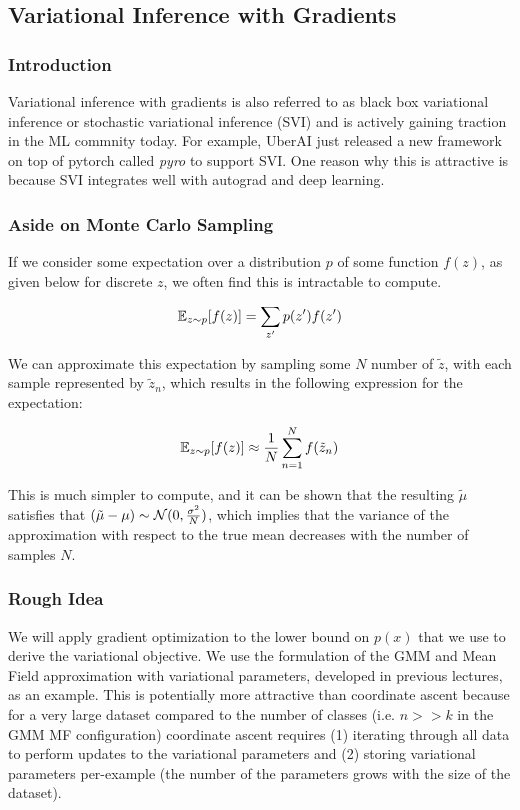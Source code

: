 \documentclass{article}
\begin{document}
\subsection{Variational Inference with Gradients}

\subsubsection{Introduction}
Variational inference with gradients is also referred to as black box variational inference or stochastic variational inference (SVI) and is actively gaining traction in the ML commnity today.  
For example, UberAI just released a new framework on top of pytorch called \textit{pyro} to support SVI.  
One reason why this is attractive is because SVI integrates well with autograd and deep learning.


\subsubsection{Aside on Monte Carlo Sampling}

If we consider some expectation over a distribution $p$ of some function $f(z)$, as given below for discrete $z$, we often find this is intractable to compute.

$$
\mathbb{E}_{z \sim p}[f(z)] = \sum_{z'} p(z') f(z')
$$

We can approximate this expectation by sampling some $N$ number of $\tilde{z}$, with each sample represented by $\tilde{z}_n$, which results in the following expression for the expectation:

$$
\mathbb{E}_{z \sim p}[f(z)] \approx \frac{1}{N} \sum_{n=1}^{N} f(\tilde{z}_n)
$$

This is much simpler to compute, and it can be shown that the resulting $\tilde{\mu}$ satisfies that $(\tilde{\mu}- \mu) \sim \mathcal{N}(0, \frac{\sigma^2}{N})$, which implies that the variance of the approximation with respect to the true mean decreases with the number of samples $N$.

\subsubsection{Rough Idea}

We will apply gradient optimization to the lower bound on $p(x)$ that we use to derive the variational objective.  
We use the formulation of the GMM and Mean Field approximation with variational parameters, developed in previous lectures, as an example.  
This is potentially more attractive than coordinate ascent because for a very large dataset compared to the number of classes (i.e. $n >> k$ in the GMM MF configuration) coordinate ascent requires (1) iterating through all data to perform updates to the variational parameters and (2) storing variational parameters per-example (the number of the parameters grows with the size of the dataset).
\end{document}
